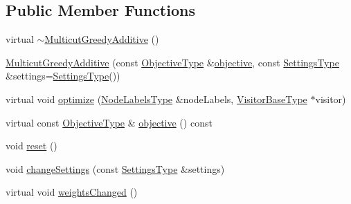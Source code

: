 \subsection*{Public Member Functions}
\begin{DoxyCompactItemize}
\item 
virtual \hyperlink{classnifty_1_1graph_1_1opt_1_1multicut_1_1MulticutGreedyAdditive_a2bb6f066a325d48d43d8ad3b05ac768e}{$\sim$\+Multicut\+Greedy\+Additive} ()
\item 
\hyperlink{classnifty_1_1graph_1_1opt_1_1multicut_1_1MulticutGreedyAdditive_a4f2b712b8bb895596630e5474aa3c74e}{Multicut\+Greedy\+Additive} (const \hyperlink{classnifty_1_1graph_1_1opt_1_1multicut_1_1MulticutGreedyAdditive_a20bb4420504be890fcb487d70fa51dc0}{Objective\+Type} \&\hyperlink{classnifty_1_1graph_1_1opt_1_1multicut_1_1MulticutGreedyAdditive_a7138955d26965ef84ce9dc6781f27c18}{objective}, const \hyperlink{classnifty_1_1graph_1_1opt_1_1multicut_1_1MulticutGreedyAdditive_a074ee39f5884cff7359f5c0997929e2f}{Settings\+Type} \&settings=\hyperlink{classnifty_1_1graph_1_1opt_1_1multicut_1_1MulticutGreedyAdditive_a074ee39f5884cff7359f5c0997929e2f}{Settings\+Type}())
\item 
virtual void \hyperlink{classnifty_1_1graph_1_1opt_1_1multicut_1_1MulticutGreedyAdditive_a1e4a7dfa8bc136b8954133928962915a}{optimize} (\hyperlink{classnifty_1_1graph_1_1opt_1_1multicut_1_1MulticutGreedyAdditive_a1a4aa1adf2a8d0183df965b535494225}{Node\+Labels\+Type} \&node\+Labels, \hyperlink{classnifty_1_1graph_1_1opt_1_1multicut_1_1MulticutGreedyAdditive_a3ff8100793fd975c52e79cdde194aa93}{Visitor\+Base\+Type} $\ast$visitor)
\item 
virtual const \hyperlink{classnifty_1_1graph_1_1opt_1_1multicut_1_1MulticutGreedyAdditive_a20bb4420504be890fcb487d70fa51dc0}{Objective\+Type} \& \hyperlink{classnifty_1_1graph_1_1opt_1_1multicut_1_1MulticutGreedyAdditive_a7138955d26965ef84ce9dc6781f27c18}{objective} () const
\item 
void \hyperlink{classnifty_1_1graph_1_1opt_1_1multicut_1_1MulticutGreedyAdditive_a71bb90e1edfa2900a941002e31160e84}{reset} ()
\item 
void \hyperlink{classnifty_1_1graph_1_1opt_1_1multicut_1_1MulticutGreedyAdditive_a21de41d91712f8078343e974f4e119c7}{change\+Settings} (const \hyperlink{classnifty_1_1graph_1_1opt_1_1multicut_1_1MulticutGreedyAdditive_a074ee39f5884cff7359f5c0997929e2f}{Settings\+Type} \&settings)
\item 
virtual void \hyperlink{classnifty_1_1graph_1_1opt_1_1multicut_1_1MulticutGreedyAdditive_a1d9cf81f32600a8f52ff4e1607203716}{weights\+Changed} ()

\end{DoxyCompactItemize}
